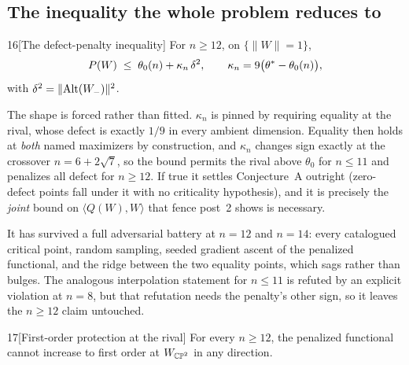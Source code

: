 \subsection{The inequality the whole problem reduces to}

\begin{Conj}{16}[The defect-penalty inequality]
For $n\ge12$, on $\{\|W\|=1\}$,
\[
P(W)\;\le\;\theta_0(n)+\kappa_n\,\delta^2,\qquad \kappa_n=9\big(\theta^{*}-\theta_0(n)\big),
\]
with $\delta^2=\|\mathrm{Alt}(W_-)\|^2$.
\end{Conj}

The shape is forced rather than fitted. $\kappa_n$ is pinned by requiring equality at the rival, whose defect is exactly $1/9$ in every ambient dimension. Equality then holds at \emph{both} named maximizers by construction, and $\kappa_n$ changes sign exactly at the crossover $n=6+2\sqrt7$, so the bound permits the rival above $\theta_0$ for $n\le11$ and penalizes all defect for $n\ge12$. If true it settles Conjecture~A outright (zero-defect points fall under it with no criticality hypothesis), and it is precisely the \emph{joint} bound on $\langle Q(W),W\rangle$ that fence post~2 shows is necessary.

It has survived a full adversarial battery at $n=12$ and $n=14$: every catalogued critical point, random sampling, seeded gradient ascent of the penalized functional, and the ridge between the two equality points, which sags rather than bulges. The analogous interpolation statement for $n\le11$ is refuted by an explicit violation at $n=8$, but that refutation needs the penalty's other sign, so it leaves the $n\ge12$ claim untouched.

\begin{Lem}{17}[First-order protection at the rival]
For every $n\ge12$, the penalized functional cannot increase to first order at $W_{\mathbb{CP}^2}$ in any direction.
\end{Lem}

